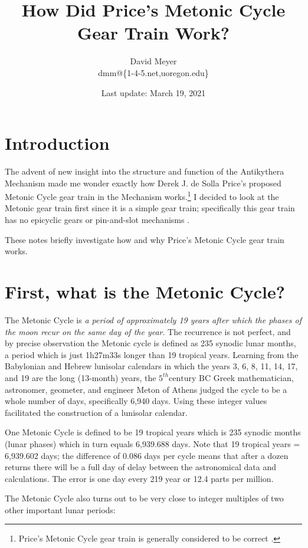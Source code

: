 \documentclass[11pt, oneside]{article}   	%
\title{How Did Price's Metonic Cycle Gear Train Work?}
\author{David Meyer \\ dmm@\{1-4-5.net,uoregon.edu\}}
\date{Last update: March 19, 2021}							%
\theoremstyle{definition}
\begin{document}
\maketitle

\section{Introduction}
The advent of new insight into the structure and function of the Antikythera Mechanism \cite{Freeth2021} made me wonder exactly how 
Derek J. de Solla Price's \cite{wiki:price} proposed Metonic Cycle gear train in the Mechanism works.\footnote{Price's Metonic Cycle gear train
is generally considered to be correct \cite{Freeth2006}.} I decided to look at the Metonic gear train first since it is a simple gear train; 
specifically this gear train has no epicyclic gears \cite{Wright2005} or pin-and-slot mechanisms \cite{Evans2010}.

\bigskip
\noindent
These notes briefly investigate how and why Price's Metonic Cycle gear train works.

\section{First, what is the Metonic Cycle?}
The Metonic Cycle is \emph{a period of approximately 19 years after which the phases of the moon recur on the same day of the year}. The recurrence is not perfect, 
and by precise observation the Metonic cycle is defined as 235 synodic lunar months, a period which is just 1h27m33s longer than 19 tropical years. Learning from the 
Babylonian and Hebrew lunisolar calendars in which the years 3, 6, 8, 11, 14, 17, and 19 are the long (13-month) years, the $5^{th} \text{century BC}$ Greek mathematician, 
astronomer, geometer, and engineer Meton of Athens \cite{wiki:menton} judged the cycle to be a whole number of days, specifically 6,940 days. Using these integer 
values facilitated  the construction of a lunisolar calendar.

\bigskip
\noindent
One Metonic Cycle is defined to be 19 tropical years which is 235 synodic months (lunar phases) which in turn equals 6,939.688 days. Note that 
19 tropical years = 6,939.602 days; the difference of 0.086 days per cycle means that after a dozen returns there will be a full day of delay between the astronomical 
data and calculations. The error is one day every 219 year or 12.4 parts per million.

\bigskip
\noindent
The Metonic Cycle also turns out to be very close to integer multiples of two other important lunar periods:
\end{document}
